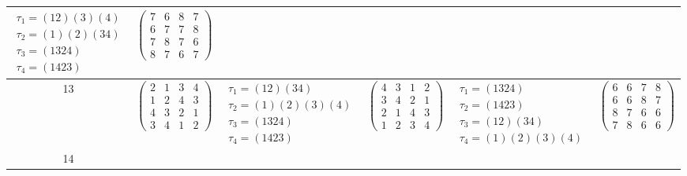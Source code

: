 \begin{longtable}{|c|p{2.7cm}|p{2.7cm}|p{2.7cm}|p{2.7cm}|p{2.7cm}|}
    $\begin{array}{l}\tau_{1}=(12)(3)(4)\\ \tau_{2}=(1)(2)(34)\\ \tau_{3}=(1324)\\ \tau_{4}=(1423)\end{array}$     &
    $\begin{pmatrix} 7 & 6 & 8 & 7 \\ 6 & 7 & 7 & 8 \\ 7 & 8 & 7 & 6 \\ 8 & 7 & 6 & 7 \end{pmatrix}$                                                                                           \\
    \hline
    13                                                                                                             &
    $\begin{pmatrix} 2 & 1 & 3 & 4 \\ 1 & 2 & 4 & 3 \\ 4 & 3 & 2 & 1 \\ 3 & 4 & 1 & 2 \end{pmatrix}$               &
    $\begin{array}{l}\tau_{1}=(12)(34)\\ \tau_{2}=(1)(2)(3)(4)\\ \tau_{3}=(1324)\\ \tau_{4}=(1423)\end{array}$     &
    $\begin{pmatrix} 4 & 3 & 1 & 2 \\ 3 & 4 & 2 & 1 \\ 2 & 1 & 4 & 3 \\ 1 & 2 & 3 & 4 \end{pmatrix}$               &
    $\begin{array}{l}\tau_{1}=(1324)\\ \tau_{2}=(1423)\\ \tau_{3}=(12)(34)\\ \tau_{4}=(1)(2)(3)(4)\end{array}$     &
    $\begin{pmatrix} 6 & 6 & 7 & 8 \\ 6 & 6 & 8 & 7 \\ 8 & 7 & 6 & 6 \\ 7 & 8 & 6 & 6 \end{pmatrix}$                                                                                           \\
    \hline
    14                                                                                                             &

\end{longtable}
